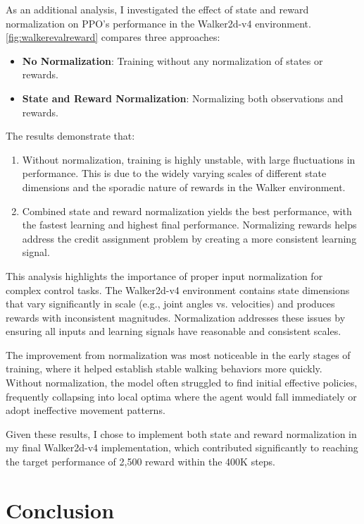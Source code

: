 \documentclass[a4paper,twocolumn]{article}
\begin{document}
As an additional analysis, I investigated the effect of state and reward normalization on PPO's performance in the Walker2d-v4 environment. \autoref{fig:walkerevalreward} compares three approaches:

\begin{itemize}
    \item \textbf{No Normalization}: Training without any normalization of states or rewards.    
    \item \textbf{State and Reward Normalization}: Normalizing both observations and rewards.
\end{itemize}

The results demonstrate that:

\begin{enumerate}
    \item Without normalization, training is highly unstable, with large fluctuations in performance. This is due to the widely varying scales of different state dimensions and the sporadic nature of rewards in the Walker environment.
    
    \item Combined state and reward normalization yields the best performance, with the fastest learning and highest final performance. Normalizing rewards helps address the credit assignment problem by creating a more consistent learning signal.
\end{enumerate}

This analysis highlights the importance of proper input normalization for complex control tasks. The Walker2d-v4 environment contains state dimensions that vary significantly in scale (e.g., joint angles vs. velocities) and produces rewards with inconsistent magnitudes. Normalization addresses these issues by ensuring all inputs and learning signals have reasonable and consistent scales.

The improvement from normalization was most noticeable in the early stages of training, where it helped establish stable walking behaviors more quickly. Without normalization, the model often struggled to find initial effective policies, frequently collapsing into local optima where the agent would fall immediately or adopt ineffective movement patterns.

Given these results, I chose to implement both state and reward normalization in my final Walker2d-v4 implementation, which contributed significantly to reaching the target performance of 2,500 reward within the 400K steps.

\section{Conclusion}
\end{document}
